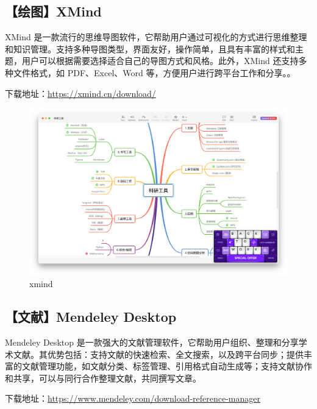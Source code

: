 \documentclass[
]{ctexbook}
\begin{document}
\hypertarget{ux7ed8ux56fexmind}{%
\subsection{【绘图】XMind}\label{ux7ed8ux56fexmind}}

XMind 是一款流行的思维导图软件，它帮助用户通过可视化的方式进行思维整理和知识管理。支持多种导图类型，界面友好，操作简单，且具有丰富的样式和主题，用户可以根据需要选择适合自己的导图方式和风格。此外，XMind 还支持多种文件格式，如 PDF、Excel、Word 等，方便用户进行跨平台工作和分享。。

下载地址：\url{https://xmind.cn/download/}

\begin{figure}
\centering
\includegraphics{Fig/skill/xmind.png}
\caption{xmind}
\end{figure}

\hypertarget{ux6587ux732emendeley-desktop}{%
\subsection{【文献】Mendeley Desktop}\label{ux6587ux732emendeley-desktop}}

Mendeley Desktop 是一款强大的文献管理软件，它帮助用户组织、整理和分享学术文献。其优势包括：支持文献的快速检索、全文搜索，以及跨平台同步；提供丰富的文献管理功能，如文献分类、标签管理、引用格式自动生成等；支持文献协作和共享，可以与同行合作整理文献，共同撰写文章。

下载地址：\url{https://www.mendeley.com/download-reference-manager}
\end{document}
